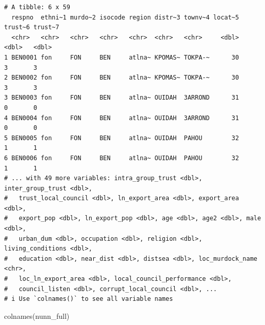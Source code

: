 \documentclass[
  letterpaper,
]{book}
\newenvironment{Shaded}{\begin{snugshade}}{\end{snugshade}}
\newcommand{\FunctionTok}[1]{\textcolor[rgb]{0.28,0.35,0.67}{#1}}
\newcommand{\NormalTok}[1]{\textcolor[rgb]{0.00,0.23,0.31}{#1}}
\theoremstyle{definition}
\theoremstyle{definition}
\theoremstyle{plain}
\theoremstyle{definition}
\theoremstyle{plain}
\theoremstyle{plain}
\theoremstyle{remark}
\begin{document}
\begin{verbatim}
# A tibble: 6 x 59
  respno  ethni~1 murdo~2 isocode region distr~3 townv~4 locat~5 trust~6 trust~7
  <chr>   <chr>   <chr>   <chr>   <chr>  <chr>   <chr>     <dbl>   <dbl>   <dbl>
1 BEN0001 fon     FON     BEN     atlna~ KPOMAS~ TOKPA-~      30       3       3
2 BEN0002 fon     FON     BEN     atlna~ KPOMAS~ TOKPA-~      30       3       3
3 BEN0003 fon     FON     BEN     atlna~ OUIDAH  3ARROND      31       0       0
4 BEN0004 fon     FON     BEN     atlna~ OUIDAH  3ARROND      31       0       0
5 BEN0005 fon     FON     BEN     atlna~ OUIDAH  PAHOU        32       1       1
6 BEN0006 fon     FON     BEN     atlna~ OUIDAH  PAHOU        32       1       1
# ... with 49 more variables: intra_group_trust <dbl>, inter_group_trust <dbl>,
#   trust_local_council <dbl>, ln_export_area <dbl>, export_area <dbl>,
#   export_pop <dbl>, ln_export_pop <dbl>, age <dbl>, age2 <dbl>, male <dbl>,
#   urban_dum <dbl>, occupation <dbl>, religion <dbl>, living_conditions <dbl>,
#   education <dbl>, near_dist <dbl>, distsea <dbl>, loc_murdock_name <chr>,
#   loc_ln_export_area <dbl>, local_council_performance <dbl>,
#   council_listen <dbl>, corrupt_local_council <dbl>, ...
# i Use `colnames()` to see all variable names
\end{verbatim}

\begin{Shaded}
\begin{Highlighting}[]
\FunctionTok{colnames}\NormalTok{(nunn\_full)}
\end{Highlighting}
\end{Shaded}
\end{document}
